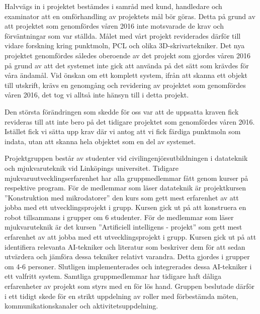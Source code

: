 Halvvägs in i projektet bestämdes i samråd med kund, handledare och examinator att en omförhandling av projektets mål bör göras. Detta på grund av att projektet som genomfördes våren 2016 inte motsvarade de krav och förväntningar som var ställda. Målet med vårt projekt reviderades därför till vidare forskning kring punktmoln, PCL och olika 3D-skrivartekniker. Det nya projektet genomfördes således oberoende av det projekt som gjordes våren 2016 på grund av att det systemet inte gick att använda på det sätt som krävdes för våra ändamål. Vid önskan om ett komplett system, ifrån att skanna ett objekt till utskrift, krävs en genomgång och revidering av projektet som genomfördes våren 2016, det tog vi alltså inte hänsyn till i detta projekt.

Den största förändringen som skedde för oss var att de uppsatta kraven fick revideras till att inte bero på det tidigare projektet som genomfördes våren 2016. Istället fick vi sätta upp krav där vi antog att vi fick färdiga punktmoln som indata, utan att skanna hela objektet som en del av systemet.

Projektgruppen består av studenter vid civilingenjörsutbildningen i datateknik och mjukvaruteknik vid Linköpings universitet. Tidigare mjukvaruutvecklingserfarenhet har alla gruppmedlemmar fått genom kurser på respektive program. För de medlemmar som läser datateknik är projektkursen ”Konstruktion med mikrodatorer” den kurs som gett mest erfarenhet av att jobba med ett utvecklingsprojekt i grupp. Kursen gick ut på att konstruera en robot tillsammans i grupper om 6 studenter. För de medlemmar som läser mjukvaruteknik är det kursen ”Artificiell intelligens - projekt” som gett mest erfarenhet av att jobba med ett utvecklingsprojekt i grupp. Kursen gick ut på att identifiera relevanta AI-tekniker och literatur som beskriver dem för att sedan utvärdera och jämföra dessa tekniker relativt varandra. Detta gjordes i grupper om 4-6 personer. Slutligen implementerades och integrerades dessa AI-tekniker i ett valfritt system. Samtliga gruppmedlemmar har tidigare haft dåliga erfarenheter av projekt som styrs med en för lös hand. Gruppen beslutade därför i ett tidigt skede för en strikt uppdelning av roller med förbestämda möten, kommunikationskanaler och aktivitetsuppdelning.


